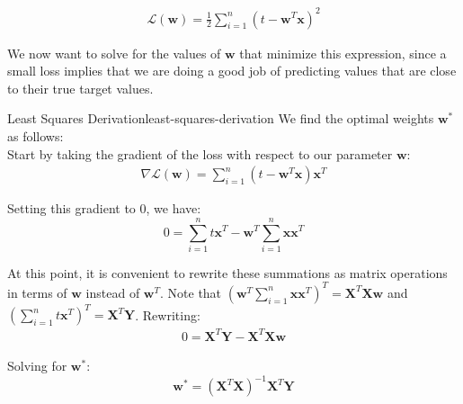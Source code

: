 \begin{align}
    \mathcal{L}(\textbf{w}) = \frac{1}{2} \sum_{i=1}^{n} (t - \textbf{w}^{T}\textbf{x})^2
\end{align}


We now want to solve for the values of $\textbf{w}$ that minimize this expression, since a small loss implies that we are doing a good job of predicting values that are close to their true target values.

\begin{derivation}{Least Squares Derivation}{least-squares-derivation}
    We find the optimal weights $\textbf{w}^{*}$ as follows: \\

    Start by taking the gradient of the loss with respect to our parameter $\textbf{w}$:
    \begin{align*}
        \nabla \mathcal{L}(\textbf{w}) = \sum_{i=1}^{n} (t - \textbf{w}^{T}\textbf{x})\textbf{x}^{T}
    \end{align*}

    Setting this gradient to 0, we have:
    \begin{equation} \label{least-squares-solving-for-w}
        0 = \sum_{i=1}^{n} t \textbf{x}^{T} - \textbf{w}^{T} \sum_{i=1}^{n} \textbf{x}\textbf{x}^{T}
    \end{equation}

    At this point, it is convenient to rewrite these summations as matrix operations in terms of $\textbf{w}$ instead of $\textbf{w}^{T}$. Note that $(\textbf{w}^{T} \sum_{i=1}^{n} \textbf{x}\textbf{x}^{T})^{T} = \textbf{X}^{T}\textbf{X}\textbf{w}$ and $(\sum_{i=1}^{n} t \textbf{x}^{T})^{T} = \textbf{X}^{T}\textbf{Y}$. Rewriting:
    \begin{align*}
        0 = \textbf{X}^{T}\textbf{Y} - \textbf{X}^{T}\textbf{X}\textbf{w}
    \end{align*}

    Solving for $\textbf{w}^{*}$:
    \begin{equation} \label{least-squares-solved-for-w}
        \textbf{w}^{*} = (\textbf{X}^{T}\textbf{X})^{-1}\textbf{X}^{T}\textbf{Y}
    \end{equation}
\end{derivation}

